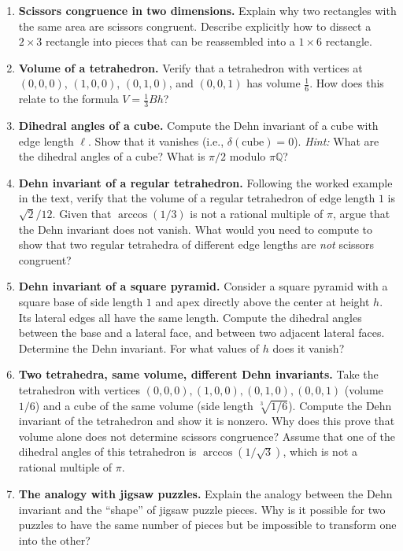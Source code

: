 \begin{enumerate}
    \item \textbf{Scissors congruence in two dimensions.} Explain why two rectangles with the same area are scissors congruent. Describe explicitly how to dissect a $2 \times 3$ rectangle into pieces that can be reassembled into a $1 \times 6$ rectangle.

    \item \textbf{Volume of a tetrahedron.} Verify that a tetrahedron with vertices at $(0,0,0)$, $(1,0,0)$, $(0,1,0)$, and $(0,0,1)$ has volume $\frac{1}{6}$. How does this relate to the formula $V = \frac{1}{3}Bh$?

    \item \textbf{Dihedral angles of a cube.} Compute the Dehn invariant of a cube with edge length $\ell$. Show that it vanishes (i.e., $\delta(\text{cube}) = 0$). \emph{Hint:} What are the dihedral angles of a cube? What is $\pi/2$ modulo $\pi\mathbb{Q}$?

    \item \textbf{Dehn invariant of a regular tetrahedron.} Following the worked example in the text, verify that the volume of a regular tetrahedron of edge length $1$ is $\sqrt2/12$. Given that $\arccos(1/3)$ is not a rational multiple of $\pi$, argue that the Dehn invariant does not vanish. What would you need to compute to show that two regular tetrahedra of different edge lengths are \emph{not} scissors congruent?

    \item \textbf{Dehn invariant of a square pyramid.} Consider a square pyramid with a square base of side length $1$ and apex directly above the center at height $h$. Its lateral edges all have the same length. Compute the dihedral angles between the base and a lateral face, and between two adjacent lateral faces. Determine the Dehn invariant. For what values of $h$ does it vanish?

    \item \textbf{Two tetrahedra, same volume, different Dehn invariants.} Take the tetrahedron with vertices $(0,0,0), (1,0,0), (0,1,0), (0,0,1)$ (volume $1/6$) and a cube of the same volume (side length $\sqrt[3]{1/6}$). Compute the Dehn invariant of the tetrahedron and show it is nonzero. Why does this prove that volume alone does not determine scissors congruence? Assume that one of the dihedral angles of this tetrahedron is $\arccos(1/\sqrt{3})$, which is not a rational multiple of $\pi$.

    \item \textbf{The analogy with jigsaw puzzles.} Explain the analogy between the Dehn invariant and the ``shape'' of jigsaw puzzle pieces. Why is it possible for two puzzles to have the same number of pieces but be impossible to transform one into the other?


\end{enumerate}
